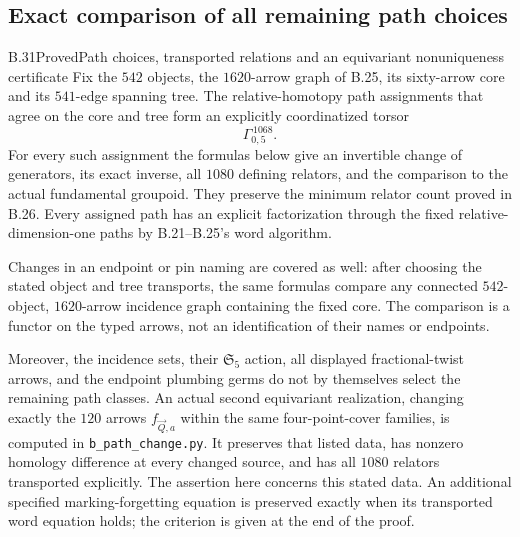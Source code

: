 
\subsection{Exact comparison of all remaining path choices}

\begin{result}{B.31}{Proved}{Path choices, transported relations and an equivariant nonuniqueness certificate}
Fix the $542$ objects, the $1620$-arrow graph of B.25, its
sixty-arrow core and its $541$-edge spanning tree.  The
relative-homotopy path assignments that agree on the core
and tree form an explicitly coordinatized torsor
\[
                  \Gamma_{0,5}^{\,1068}.                       \tag{B.109}
\]
For every such assignment the formulas below give an
invertible change of generators, its exact inverse, all
$1080$ defining relators, and the comparison to the actual
fundamental groupoid.  They preserve the minimum relator
count proved in B.26.  Every assigned path has an explicit
factorization through the fixed relative-dimension-one
paths by B.21--B.25's word algorithm.

Changes in an endpoint or pin naming are covered as well:
after choosing the stated object and tree transports, the
same formulas compare any connected $542$-object,
$1620$-arrow incidence graph containing the fixed core.
The comparison is a functor on the typed arrows, not an
identification of their names or endpoints.

Moreover, the incidence sets, their $\mathfrak S_5$ action,
all displayed fractional-twist arrows, and the endpoint
plumbing germs do not by themselves select the remaining
path classes.  An actual second equivariant realization,
changing exactly the $120$ arrows $f_{\vec Q,a}$ within the
same four-point-cover families, is computed in
\texttt{b\_path\_change.py}.  It preserves that listed data,
has nonzero homology difference at every changed source,
and has all $1080$ relators transported explicitly.
The assertion here concerns this stated data.  An additional
specified marking-forgetting equation is preserved exactly
when its transported word equation holds; the criterion is
given at the end of the proof.
\end{result}

